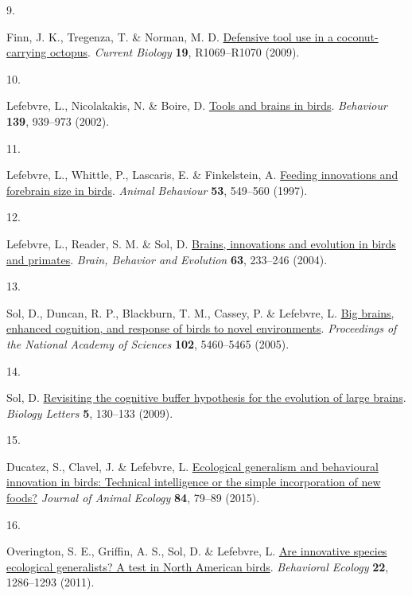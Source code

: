\documentclass[
  man,floatsintext]{apa6}
\newlength{\cslhangindent}
\newlength{\csllabelwidth}
\newlength{\cslentryspacingunit} %
\newenvironment{CSLReferences}[2] %
 {%
  \setlength{\parindent}{0pt}
  \ifodd #1
  \let\oldpar\par
  \def\par{\hangindent=\cslhangindent\oldpar}
  \fi
  \setlength{\parskip}{#2\cslentryspacingunit}
 }%
 {}
\newcommand{\CSLLeftMargin}[1]{\parbox[t]{\csllabelwidth}{#1}}
\newcommand{\CSLRightInline}[1]{\parbox[t]{\linewidth - \csllabelwidth}{#1}\break}
\begin{document}
\begin{CSLReferences}{0}{0}
\leavevmode{}%
\CSLLeftMargin{9. }%
\CSLRightInline{Finn, J. K., Tregenza, T. \& Norman, M. D. \href{https://doi.org/10.1016/j.cub.2009.10.052}{Defensive tool use in a coconut-carrying octopus}. \emph{Current Biology} \textbf{19}, R1069--R1070 (2009).}

\leavevmode{}%
\CSLLeftMargin{10. }%
\CSLRightInline{Lefebvre, L., Nicolakakis, N. \& Boire, D. \href{https://doi.org/10.1163/156853902320387918}{Tools and brains in birds}. \emph{Behaviour} \textbf{139}, 939--973 (2002).}

\leavevmode{}%
\CSLLeftMargin{11. }%
\CSLRightInline{Lefebvre, L., Whittle, P., Lascaris, E. \& Finkelstein, A. \href{https://doi.org/10.1006/anbe.1996.0330}{Feeding innovations and forebrain size in birds}. \emph{Animal Behaviour} \textbf{53}, 549--560 (1997).}

\leavevmode{}%
\CSLLeftMargin{12. }%
\CSLRightInline{Lefebvre, L., Reader, S. M. \& Sol, D. \href{https://doi.org/10.1159/000076784}{Brains, innovations and evolution in birds and primates}. \emph{Brain, Behavior and Evolution} \textbf{63}, 233--246 (2004).}

\leavevmode{}%
\CSLLeftMargin{13. }%
\CSLRightInline{Sol, D., Duncan, R. P., Blackburn, T. M., Cassey, P. \& Lefebvre, L. \href{https://doi.org/10.1073/pnas.0408145102}{Big brains, enhanced cognition, and response of birds to novel environments}. \emph{Proceedings of the National Academy of Sciences} \textbf{102}, 5460--5465 (2005).}

\leavevmode{}%
\CSLLeftMargin{14. }%
\CSLRightInline{Sol, D. \href{https://doi.org/10.1098/rsbl.2008.0621}{Revisiting the cognitive buffer hypothesis for the evolution of large brains}. \emph{Biology Letters} \textbf{5}, 130--133 (2009).}

\leavevmode{}%
\CSLLeftMargin{15. }%
\CSLRightInline{Ducatez, S., Clavel, J. \& Lefebvre, L. \href{https://doi.org/10.1111/1365-2656.12255}{Ecological generalism and behavioural innovation in birds: Technical intelligence or the simple incorporation of new foods?} \emph{Journal of Animal Ecology} \textbf{84}, 79--89 (2015).}

\leavevmode{}%
\CSLLeftMargin{16. }%
\CSLRightInline{Overington, S. E., Griffin, A. S., Sol, D. \& Lefebvre, L. \href{https://doi.org/10.1093/beheco/arr130}{Are innovative species ecological generalists? A test in {N}orth {A}merican birds}. \emph{Behavioral Ecology} \textbf{22}, 1286--1293 (2011).}


\end{CSLReferences}
\end{document}
